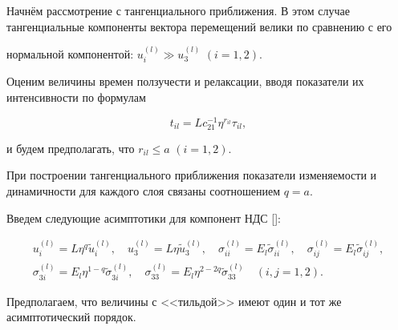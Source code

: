 \smallskip




Начнём рассмотрение с тангенциального приближения. В этом случае тангенциальные компоненты вектора перемещений велики по сравнению с его

нормальной компонентой: $u_i^{(l)} \gg u_3^{(l)}$ $(i=1, 2)$.



Оценим величины времен ползучести и релаксации, вводя показатели их интенсивности по формулам

\begin{equation}

\label{anofr:eq_6}

t_{il} =Lc_{21}^{-1} \eta^{r_{il}} \tau _{il},

\end{equation}

и будем предполагать, что $r_{il} \le a$ $(i=1, 2)$.



При построении тангенциального приближения показатели изменяемости и динамичности для каждого слоя связаны соотношением $q=a$.

Введем следующие асимптотики для компонент НДС []:

\begin{equation}

\label{anofr:eq_7}

\begin{array}{c}

u_i^{(l)} =L\eta ^q \tilde{u}_i^{(l)}, \quad u_3^{(l)} =L\eta \tilde{u}_3^{(l)},\quad

\sigma _{ii}^{(l)} =E_l \tilde{\sigma}_{ii}^{(l)}, \quad \sigma _{ij}^{(l)} =E_l \tilde{\sigma }_{ij}^{(l)}, \\

\sigma _{3i}^{(l)} =E_l \eta^{1-q} \tilde{\sigma}_{3i}^{(l)}, \quad \sigma _{33}^{(l)} =E_{l} \eta ^{2-2q} \tilde{\sigma }_{33}^{(l)}

\quad  (i,j=1, 2).

\end{array}

\end{equation}



Предполагаем, что величины с <<тильдой>> имеют один и тот же асимптотический порядок.




